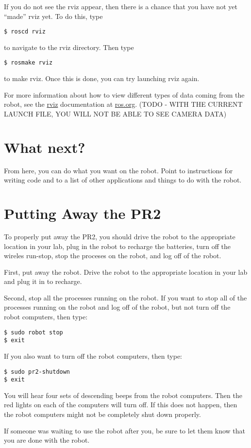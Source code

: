 If you do not see the rviz appear, then there is a chance that you have not yet ``made'' rviz yet. To do this, type
\begin{verbatim}
$ roscd rviz
\end{verbatim}
to navigate to the rviz directory. Then type
\begin{verbatim}
$ rosmake rviz
\end{verbatim}
to make rviz. Once this is done, you can try launching rviz again.

For more information about how to view different types 
of data coming from the robot, see the \href{http://ros.org/wiki/rviz}{rviz} documentation at 
\href{http://www.ros.org}{ros.org}.
(TODO - WITH THE CURRENT LAUNCH FILE, YOU WILL NOT BE ABLE TO SEE CAMERA DATA)

\section{What next?}
From here, you can do what you want on the robot.  Point to instructions for writing code and to a list of other 
applications and things to do with the robot.

\section{Putting Away the PR2}
To properly put away the PR2, you should drive the robot to the appropriate location in your lab, plug in the robot to recharge the batteries, turn off the wireles run-stop, stop the proceses on the robot, and log off of the robot.

First, put away the robot. Drive the robot to the appropriate location in your lab and plug it in to recharge.

Second, stop all the processes running on the robot. If you want to stop all of the processes running on the robot and log off of the robot, but not turn off the robot computers, then type:
\begin{verbatim}
$ sudo robot stop
$ exit
\end{verbatim}
If you also want to turn off the robot computers, then type:
\begin{verbatim}
$ sudo pr2-shutdown
$ exit
\end{verbatim}
You will hear four sets of descending beeps from the robot computers. Then the red lights on each of the computers will turn off. If this does not happen, then the robot computers might not be completely shut down properly.

If someone was waiting to use the robot after you, be sure to let them know that you are done with the robot.
